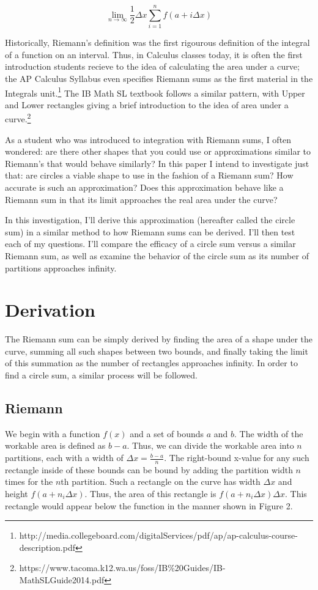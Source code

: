 \documentclass{article}
\begin{document}
    \[ \displaystyle\lim_{n \to \infty}\frac{1}{2}\Delta x\sum_{i=1}^n f(a+i\Delta x) \]

    Historically, Riemann's definition was the first rigourous definition of the integral of a function on an interval. Thus, in Calculus classes today, it is often the first introduction students recieve to the idea of calculating the area under a curve; the AP Calculus Syllabus even specifies Riemann sums as the first material in the Integrals unit.\footnote{http://media.collegeboard.com/digitalServices/pdf/ap/ap-calculus-course-description.pdf} The IB Math SL textbook follows a similar pattern, with Upper and Lower rectangles giving a brief introduction to the idea of area under a curve.\footnote{https://www.tacoma.k12.wa.us/foss/IB\%20Guides/IB-MathSLGuide2014.pdf}

    As a student who was introduced to integration with Riemann sums, I often wondered: are there other shapes that you could use or approximations similar to Riemann's that would behave similarly? In this paper I intend to investigate just that: are circles a viable shape to use in the fashion of a Riemann sum? How accurate is such an approximation? Does this approximation behave like a Riemann sum in that its limit approaches the real area under the curve?

    In this investigation, I'll derive this approximation (hereafter called the circle sum) in a similar method to how Riemann sums can be derived. I'll then test each of my questions. I'll compare the efficacy of a circle sum versus a similar Riemann sum, as well as examine the behavior of the circle sum as its number of partitions approaches infinity.

  \section{Derivation}
    The Riemann sum can be simply derived by finding the area of a shape under the curve, summing all such shapes between two bounds, and finally taking the limit of this summation as the number of rectangles approaches infinity. In order to find a circle sum, a similar process will be followed.

    \subsection{Riemann}
      We begin with a function \( f(x) \) and a set of bounds \( a \) and \( b \). The width of the workable area is defined as \( b-a \). Thus, we can divide the workable area into \( n \) partitions, each with a width of \( \Delta x = \frac{b-a}{n} \). The right-bound x-value for any such rectangle inside of these bounds can be bound by adding the partition width \( n \) times for the \(n\)th partition. Such a rectangle on the curve has width \( \Delta x \) and height \( f(a+n_i\Delta x) \). Thus, the area of this rectangle is \( f(a+n_i\Delta x)\Delta x \). This rectangle would appear below the function in the manner shown in Figure 2.
\end{document}

